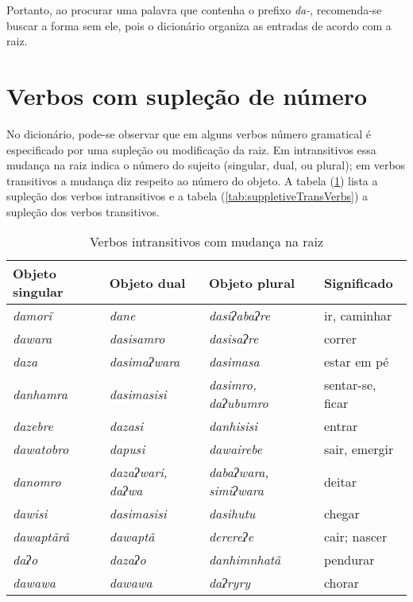 Portanto, ao procurar uma palavra que contenha o prefixo \textit{da-}, recomenda-se buscar a forma sem ele, pois o dicionário organiza as entradas de acordo com a raiz.

\section*{Verbos com supleção de número}

No dicionário, pode-se observar que em alguns verbos número gramatical é especificado por uma supleção ou modificação da raiz. Em intransitivos essa mudança na raiz indica o número do sujeito (singular, dual, ou plural); em verbos transitivos a mudança diz respeito ao número do objeto. A tabela (\ref{tab:suppletiveIntrVerbs}) lista a supleção dos verbos intransitivos e a tabela (\ref{tab:suppletiveTransVerbs}) a supleção dos verbos transitivos.

\begin{table}
\begin{tabular}{llll}\toprule
Objeto singular & Objeto dual & Objeto plural & Significado  \\\midrule
\textit{damorĩ} & \textit{dane} & \textit{dasiʔabaʔre} & ir, caminhar \\
\textit{dawara} & \textit{dasisamro} & \textit{dasisaʔre} & correr \\
\textit{daza} & \textit{dasimaʔwara} & \textit{dasimasa} & estar em pé \\
\textit{danhamra} & \textit{dasimasisi} & \textit{dasimro, daʔubumro} & sentar-se, ficar\\
\textit{dazebre} & \textit{dazasi} & \textit{danhisisi} & entrar \\
\textit{dawatobro} & \textit{dapusi} & \textit{dawairebe} & sair, emergir\\
\textit{danomro} & \textit{dazaʔwari, daʔwa} & \textit{dabaʔwara, simiʔwara} & deitar\\
\textit{dawisi} & \textit{dasimasisi} & \textit{dasihutu} & chegar \\
\textit{dawaptãrã} & \textit{dawaptã} & \textit{derereʔe} & cair; nascer \\
\textit{daʔo} & \textit{dazaʔo} & \textit{danhimnhatã} & pendurar\\
\textit{dawawa} & \textit{dawawa} & \textit{daʔryry} & chorar \\\bottomrule
\end{tabular}
\caption{Verbos intransitivos com mudança na raiz}
\label{tab:suppletiveIntrVerbs}
\end{table}

